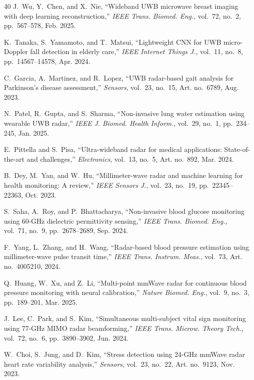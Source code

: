 \documentclass[journal,twoside]{IEEEtran}
\begin{document}
\begin{thebibliography}{40}
J.~Wu, Y.~Chen, and X.~Nie, ``Wideband UWB microwave breast imaging with deep learning reconstruction,'' \textit{IEEE Trans. Biomed. Eng.}, vol.~72, no.~2, pp.~567--578, Feb. 2025.

K.~Tanaka, S.~Yamamoto, and T.~Matsui, ``Lightweight CNN for UWB micro-Doppler fall detection in elderly care,'' \textit{IEEE Internet Things J.}, vol.~11, no.~8, pp.~14567--14578, Apr. 2024.

C.~Garcia, A.~Martinez, and R.~Lopez, ``UWB radar-based gait analysis for Parkinson's disease assessment,'' \textit{Sensors}, vol.~23, no.~15, Art. no.~6789, Aug. 2023.

N.~Patel, R.~Gupta, and S.~Sharma, ``Non-invasive lung water estimation using wearable UWB radar,'' \textit{IEEE J. Biomed. Health Inform.}, vol.~29, no.~1, pp.~234--245, Jan. 2025.

E.~Pittella and S.~Pisa, ``Ultra-wideband radar for medical applications: State-of-the-art and challenges,'' \textit{Electronics}, vol.~13, no.~5, Art. no.~892, Mar. 2024.

B.~Dey, M.~Yan, and W.~Hu, ``Millimeter-wave radar and machine learning for health monitoring: A review,'' \textit{IEEE Sensors J.}, vol.~23, no.~19, pp.~22345--22363, Oct. 2023.

S.~Saha, A.~Roy, and P.~Bhattacharya, ``Non-invasive blood glucose monitoring using 60-GHz dielectric permittivity sensing,'' \textit{IEEE Trans. Biomed. Eng.}, vol.~71, no.~9, pp.~2678--2689, Sep. 2024.

F.~Yang, L.~Zhang, and H.~Wang, ``Radar-based blood pressure estimation using millimeter-wave pulse transit time,'' \textit{IEEE Trans. Instrum. Meas.}, vol.~73, Art. no.~4005210, 2024.

Q.~Huang, W.~Xu, and Z.~Li, ``Multi-point mmWave radar for continuous blood pressure monitoring with neural calibration,'' \textit{Nature Biomed. Eng.}, vol.~9, no.~3, pp.~189--201, Mar. 2025.

J.~Lee, C.~Park, and S.~Kim, ``Simultaneous multi-subject vital sign monitoring using 77-GHz MIMO radar beamforming,'' \textit{IEEE Trans. Microw. Theory Tech.}, vol.~72, no.~6, pp.~3890--3902, Jun. 2024.

W.~Choi, S.~Jung, and D.~Kim, ``Stress detection using 24-GHz mmWave radar heart rate variability analysis,'' \textit{Sensors}, vol.~23, no.~22, Art. no.~9123, Nov. 2023.


\end{thebibliography}
\end{document}
